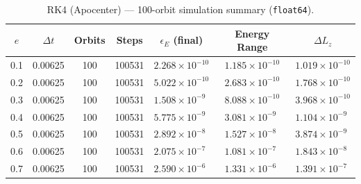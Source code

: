 \documentclass[twocolumn, 10pt]{article}
\begin{document}
\begin{table}[htbp]
\centering
\caption{RK4 (Apocenter) --- 100-orbit simulation summary (\texttt{float64}).}
\label{tab:rk4_apo}
\begin{tabular}{@{}ccccccc@{}}
\toprule
$e$ & $\Delta t$ & Orbits & Steps & $\epsilon_E$ (final) & Energy Range & $\Delta L_z$ \\
\midrule
0.1 & 0.00625 & 100 & 100531 & $2.268 \times 10^{-10}$ & $1.185 \times 10^{-10}$ & $1.019 \times 10^{-10}$ \\
0.2 & 0.00625 & 100 & 100531 & $5.022 \times 10^{-10}$ & $2.683 \times 10^{-10}$ & $1.768 \times 10^{-10}$ \\
0.3 & 0.00625 & 100 & 100531 & $1.508 \times 10^{-9\phantom{0}}$ & $8.088 \times 10^{-10}$ & $3.968 \times 10^{-10}$ \\
0.4 & 0.00625 & 100 & 100531 & $5.775 \times 10^{-9\phantom{0}}$ & $3.081 \times 10^{-9\phantom{0}}$ & $1.104 \times 10^{-9\phantom{0}}$ \\
0.5 & 0.00625 & 100 & 100531 & $2.892 \times 10^{-8\phantom{0}}$ & $1.527 \times 10^{-8\phantom{0}}$ & $3.874 \times 10^{-9\phantom{0}}$ \\
0.6 & 0.00625 & 100 & 100531 & $2.075 \times 10^{-7\phantom{0}}$ & $1.081 \times 10^{-7\phantom{0}}$ & $1.843 \times 10^{-8\phantom{0}}$ \\
0.7 & 0.00625 & 100 & 100531 & $2.590 \times 10^{-6\phantom{0}}$ & $1.331 \times 10^{-6\phantom{0}}$ & $1.391 \times 10^{-7\phantom{0}}$ \\
\bottomrule
\end{tabular}
\end{table}
\end{document}
